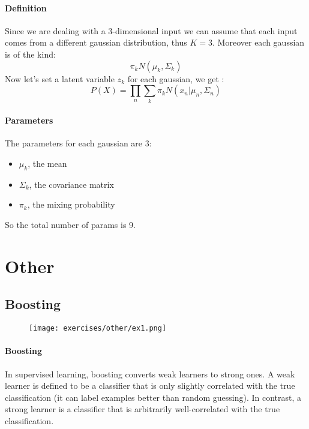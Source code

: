\paragraph{Definition}
Since we are dealing with a 3-dimensional input we can assume that each input comes from a different gaussian distribution, thus $K=3$. Moreover each gaussian is of the kind:
$$\pi_k N(\mu_k,\Sigma_k)$$
Now let's set a latent variable $z_k$ for each gaussian, we get :
$$P(X)=\prod_n \sum_k \pi_k N(x_n|\mu_n,\Sigma_n)$$

\paragraph{Parameters}
The parameters for each gaussian are 3:
\begin{itemize}
\item $\mu_k$, the mean
\item $\Sigma_k$, the covariance matrix
\item $\pi_k$, the mixing probability
\end{itemize}
So the total number of params is 9.

\section{Other}


\subsection{Boosting}

\begin{figure}[H]
    \centering
    \texttt{[image: exercises/other/ex1.png]}
\end{figure}

\paragraph{Boosting}
In supervised learning, boosting converts weak learners to strong ones. A weak learner is defined to be a classifier that is only slightly correlated with the true classification (it can label examples better than random guessing). In contrast, a strong learner is a classifier that is arbitrarily well-correlated with the true classification.

